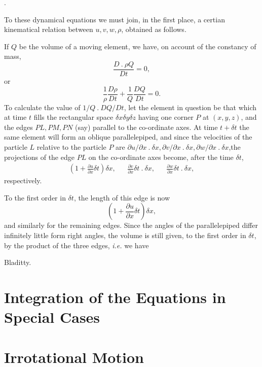 \documentclass[twoside, openany]{book}
\newcommand{\edot}{\>.\>}
\newcommand{\pdiff}[2]{\frac{\partial #1}{\partial #2}}
\newcounter{article}
\newcommand{\article}[1]{
  \stepcounter{article}
  \textbf{\thearticle}.
  \markright{#1} %
}
\numberwithin{equation}{article} %
\begin{document}
\article{a7}
To these dynamical equations we must join, in the first place, a certian kinematical relation between $u, v, w, \rho$, obtained as follows.

If $Q$ be the volume of a moving element, we have, on account of the constancy of mass,
\begin{equation*}
\frac{D\edot \rho Q}{Dt} = 0,
\end{equation*}
or %
\begin{equation}
\frac{1}{\rho} \frac{D\rho}{Dt} + \frac{1}{Q} \frac{DQ}{Dt} = 0.
\end{equation}
To calculate the value of $1/Q\edot DQ/Dt$, let the element in question be that which at time $t$ fills the rectangular space $\delta x \delta y \delta z$ having one corner $P$ at $(x, y, z)$, and the edges $PL, PM, PN$ (say) parallel to the co-ordinate axes. At time $t+\delta t$ the same element will form an oblique parallelepiped, and since the velocities of the particle $L$ relative to the particle $P$ are $\partial u/\partial x \edot \delta x, \partial v /\partial x \edot \delta x, \partial w/\partial x\edot \delta x$,the projections of the edge $PL$ on the co-ordinate axes become, after the time $\delta t$,
\begin{align*} %
\left(1+\pdiff{u}{x} \delta t \right) \delta x, && \pdiff{v}{x}\delta t \edot \delta x, && \pdiff{w}{x} \delta t \edot \delta x,
\end{align*}
respectively.

To the first order in $\delta t$, the length of this edge is now
\begin{equation*}
\left(1+\pdiff{u}{x}\delta t\right)\delta x,
\end{equation*}
and similarly for the remaining edges. Since the angles of the parallelepiped differ infinitely little form right angles, the volume is still given, to the first order in $\delta t$, by the product of the three edges, \emph{i.e.} we have

\label{a14}Bladitty.

\chapter{Integration of the Equations in Special Cases}

\chapter{Irrotational Motion}
\end{document}
